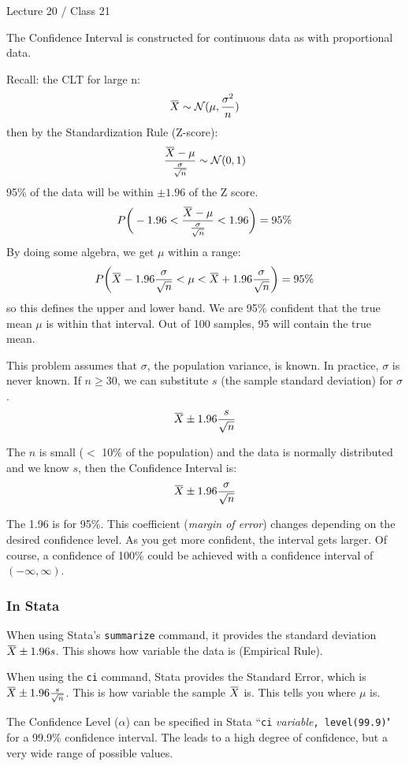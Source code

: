 \documentclass[11pt, oneside]{article}   	%
\newcommand{\overbar}[1]{\mkern 1.5mu\overline{\mkern-1.5mu#1\mkern-1.5mu}\mkern 1.5mu}
\begin{document}
Lecture 20 / Class 21

The Confidence Interval is constructed for continuous data as with proportional data.

Recall: the CLT for large n:
\[
\overbar{X} \sim \mathcal{N}(\mu, \frac{\sigma^2}{n})
\]
then by the Standardization Rule (Z-score):
\[
\frac{ \overbar{X} - \mu} {\frac{\sigma} {\sqrt{n}} } \sim \mathcal{N}(0,1)
\]
95\% of the data will be within $\pm1.96$ of the Z score.
\[
P\bigg(-1.96 < \frac{ \overbar{X} - \mu} {\frac{\sigma} {\sqrt{n}} } < 1.96\bigg) = 95\%
\]
By doing some algebra, we get $\mu$ within a range:
\[
P\bigg(\overbar{X} - 1.96 \frac{\sigma} {\sqrt{n}} < \mu < \overbar{X} + 1.96 \frac{\sigma} {\sqrt{n}}\bigg) = 95\%
\]
so this defines the upper and lower band. We are 95\% confident that the true mean $\mu$ is within that interval. Out of 100 samples, 95 will contain the true mean.

This problem assumes that $\sigma$, the population variance, is known. In practice, $\sigma$ is never known. If $n  \geq 30$, we can substitute $s$ (the sample standard deviation) for $\sigma$. 
\[
\overbar{X} \pm1.96\frac{s} {\sqrt{n}}
\]

The $n$ is small ($<$ 10\% of the population) and the data is normally distributed and we know $s$, then the Confidence Interval is:
\[
\overbar{X} \pm1.96\frac{\sigma} {\sqrt{n}}
\]

The 1.96 is for 95\%. This coefficient (\textit{margin of error}) changes depending on the desired confidence level. As you get more confident, the interval gets larger. Of course, a confidence of 100\% could be achieved with a confidence interval of $(-\infty, \infty)$.

\subsubsection{In Stata}

When using Stata's \texttt{summarize} command, it provides the standard deviation $\overbar{X} \pm1.96 s$. This shows how variable the data is (Empirical Rule).

When using the \texttt{ci} command, Stata provides the Standard Error, which is $\overbar{X} \pm1.96 \frac{s} {\sqrt{n}}$. This is how variable the sample $\overbar{X}$ is. This tells you where $\mu$ is.

The Confidence Level ($\alpha$) can be specified in Stata ``\texttt{ci} \textit{variable}\texttt{, level(99.9)}" for a 99.9\% confidence interval. The leads to a high degree of confidence, but a very wide range of possible values.
\end{document}
